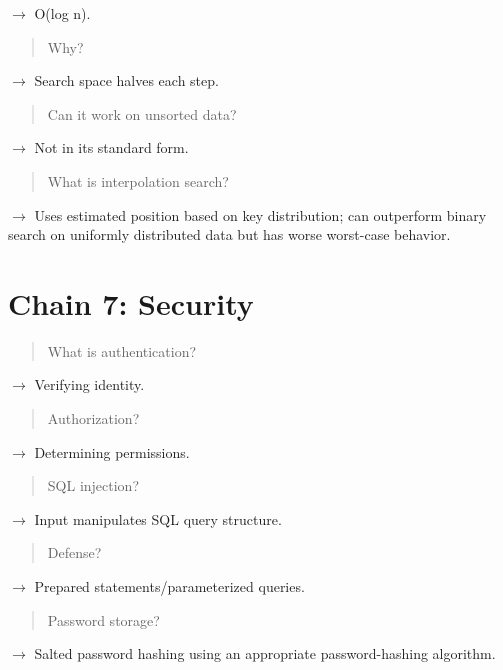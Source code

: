 $\rightarrow$ O(log n).

\begin{quote}
Why?\\
\end{quote}

$\rightarrow$ Search space halves each step.

\begin{quote}
Can it work on unsorted data?\\
\end{quote}

$\rightarrow$ Not in its standard form.

\begin{quote}
What is interpolation search?\\
\end{quote}

$\rightarrow$ Uses estimated position based on key distribution; can outperform binary search on uniformly distributed data but has worse worst-case behavior.

\medskip

\section{Chain 7: Security}

\begin{quote}
What is authentication?\\
\end{quote}

$\rightarrow$ Verifying identity.

\begin{quote}
Authorization?\\
\end{quote}

$\rightarrow$ Determining permissions.

\begin{quote}
SQL injection?\\
\end{quote}

$\rightarrow$ Input manipulates SQL query structure.

\begin{quote}
Defense?\\
\end{quote}

$\rightarrow$ Prepared statements/parameterized queries.

\begin{quote}
Password storage?\\
\end{quote}

$\rightarrow$ Salted password hashing using an appropriate password-hashing algorithm.

\medskip
